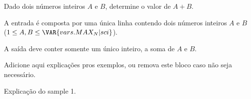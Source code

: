 

Dado dois números inteiros $A$ e $B$, determine o valor de $A + B$.

A entrada é composta por uma única linha contendo dois números
inteiros $A$ e $B$ ($1 \leq A, B \leq \VAR{vars.MAX_N | sci}$).

A saída deve conter somente um único inteiro, a soma de $A$ e $B$.

Adicione aqui explicações pros exemplos, ou remova este bloco caso não seja necessário.

Explicação do sample 1.
